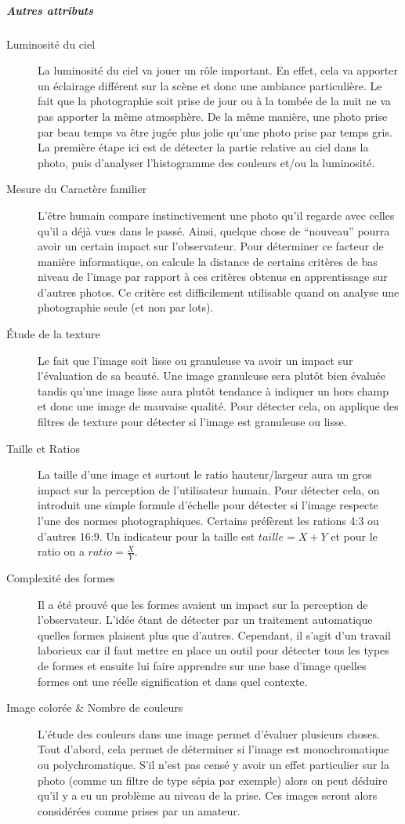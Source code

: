 \documentclass[11pt, french,screen]{report-rd-info}
\begin{document}
\subparagraph{Autres attributs}
\begin{description}

\item[Luminosité du ciel]
La luminosité du ciel va jouer un rôle important. En effet, cela va apporter un éclairage différent sur la scène et donc une ambiance particulière. Le fait que la photographie soit prise de jour ou à la tombée de la nuit ne va pas apporter la même atmosphère. De la même manière, une photo prise par beau temps va être jugée plus jolie qu’une photo prise par temps gris. La première étape ici est de détecter la partie relative au ciel dans la photo, puis d’analyser l’histogramme des couleurs et/ou la luminosité.
\item[Mesure du Caractère familier]
L’être humain compare instinctivement une photo qu’il regarde avec celles qu’il a déjà vues dans le passé. Ainsi, quelque chose de “nouveau” pourra avoir un certain impact sur l’observateur. Pour déterminer ce facteur de manière informatique, on calcule la distance de certains critères de bas niveau de l’image par rapport à ces critères obtenus en apprentissage sur d’autres photos. Ce critère est difficilement utilisable quand on analyse une photographie seule (et non par lots).
\item[Étude de la texture]
Le fait que l’image soit lisse ou granuleuse va avoir un impact sur l’évaluation de sa beauté. Une image granuleuse sera plutôt bien évaluée tandis qu’une image lisse aura plutôt tendance à indiquer un hors champ et donc une image de mauvaise qualité. Pour détecter cela, on applique des filtres de texture pour détecter si l’image est granuleuse ou lisse.
\item[Taille et Ratios]
La taille d’une image et surtout le ratio hauteur/largeur aura un gros impact sur la perception de l’utilisateur humain. Pour détecter cela, on introduit une simple formule d’échelle pour détecter si l’image respecte l’une des normes photographiques. Certains préfèrent les rations 4:3 ou d’autres 16:9. Un indicateur pour la taille est $taille = X+Y$ et pour le ratio on a $ratio = \frac{X}{Y}$.

\item[Complexité des formes]
Il a été prouvé que les formes avaient un impact sur la perception de l’observateur. L'idée étant de détecter par un traitement automatique quelles formes plaisent plus que d’autres. Cependant, il s’agit d’un travail laborieux car il faut mettre en place un outil pour détecter tous les types de formes et ensuite lui faire apprendre sur une base d’image quelles formes ont une réelle signification et dans quel contexte.
\item[Image colorée \& Nombre de couleurs]
L’étude des couleurs dans une image permet d’évaluer plusieurs choses. Tout d’abord, cela permet de déterminer si l’image est monochromatique  ou polychromatique. S’il n’est pas censé y avoir un effet particulier sur la photo (comme un filtre de type sépia par exemple) alors on peut déduire qu’il y a eu un problème au niveau de la prise. Ces images seront alors considérées comme prises par un amateur.


\end{description}
\end{document}
